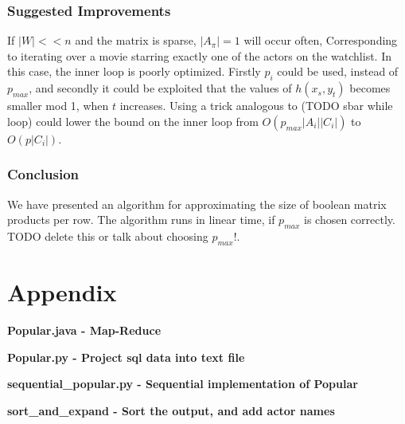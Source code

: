 \documentclass[a4paper,11pt]{article}
\begin{document}
\subsubsection{Suggested Improvements}
If $|W|<<n$ and the matrix is sparse, $|A_{\pi}|=1$ will occur often, Corresponding to iterating over a movie starring exactly one of the actors on the watchlist. In this case, the inner loop is poorly optimized. Firstly $p_i$ could be used, instead of $p_{max}$, and secondly it could be exploited that the values of $h(x_s, y_t)$ becomes smaller mod 1, when $t$ increases. Using a trick analogous to (TODO sbar while loop) could lower the bound on the inner loop from $O(p_{max}|A_i||C_i|)$ to $O(p|C_i|)$.



\subsubsection{Conclusion}
We have presented an algorithm for approximating the size of boolean matrix products per row. The algorithm runs in linear time, if $p_{max}$ is chosen correctly. TODO delete this or talk about choosing $p_{max}$!.



\section{Appendix}
\textbf{Popular.java - Map-Reduce}

\textbf{Popular.py - Project sql data into text file}

\textbf{sequential\_popular.py - Sequential implementation of Popular}

\textbf{sort\_and\_expand - Sort the output, and add actor names}

\end{document}
